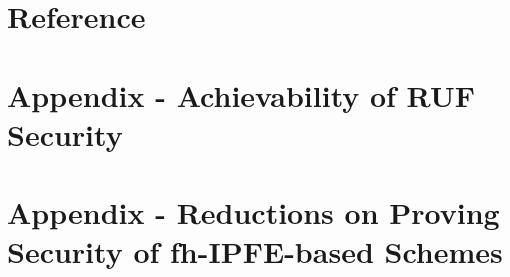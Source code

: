 

\section*{Reference}




\appendix
\backupbegin

\section{Appendix - Achievability of RUF Security}
\hypertarget{sec:appendix-RUF}{}
\label{sec:appendix-A}


\section{Appendix - Reductions on Proving Security of fh-IPFE-based Schemes}
\hypertarget{sec:appendix-reduction}{}
\label{sec:appendix-B}

\backupend


